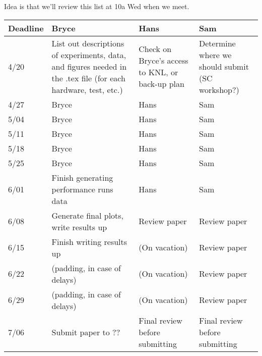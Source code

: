 Idea is that we'll review this list at 10a Wed when we meet.
\begin{center}
\begin{tabular}{ |l|p{5cm}|p{5cm}|p{5cm}| } 
\hline
Deadline & Bryce & Hans & Sam \\
\hline
4/20 
  & List out descriptions of experiments, data, and figures needed in the .tex file (for each hardware, test, etc.)
  & Check on Bryce's access to KNL, or back-up plan
  & Determine where we should submit (SC workshop?) \\
\hline
4/27 
  & Bryce 
  & Hans 
  & Sam \\
\hline
5/04
  & Bryce 
  & Hans 
  & Sam \\
\hline
5/11
  & Bryce 
  & Hans 
  & Sam \\
\hline
5/18
  & Bryce 
  & Hans 
  & Sam \\
\hline
5/25
  & Bryce 
  & Hans 
  & Sam \\
\hline
6/01 
  & Finish generating performance runs data 
  & Hans 
  & Sam \\
\hline
6/08 
  & Generate final plots, write results up
  & Review paper 
  & Review paper \\
\hline
6/15 
  & Finish writing results up 
  & (On vacation) 
  & Review paper \\
\hline
6/22 
  & (padding, in case of delays)
  & (On vacation) 
  & Review paper \\
\hline
6/29 
  & (padding, in case of delays)
  & (On vacation) 
  & Review paper \\
\hline
7/06 
  & Submit paper to ?? 
  & Final review before submitting
  & Final review before submitting \\
\hline
\end{tabular}
\end{center}

